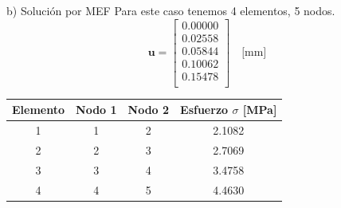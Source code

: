 \begin{desarrollo}{b) Soluci\'on por MEF}
Para este caso tenemos 4 elementos, 5 nodos.
\begin{equation}
\mathbf{u} = \begin{bmatrix}
    0.00000 \\
    0.02558 \\
    0.05844 \\
    0.10062 \\
    0.15478 \\
\end{bmatrix} \quad \text{[mm]}
\label{tab:esfuerzos4}
\end{equation}

\begin{center}
    
    \centering
    \begin{tabular}{cccc}
        \hline
        \textbf{Elemento} & \textbf{Nodo 1} & \textbf{Nodo 2} & \textbf{Esfuerzo $\sigma$ [MPa]} \\
        \hline
        1 & 1 & 2 & 2.1082 \\
        2 & 2 & 3 & 2.7069 \\
        3 & 3 & 4 & 3.4758 \\
        4 & 4 & 5 & 4.4630 \\
        \hline
    \end{tabular}
\label{tab:esfuerzos4}

    \label{tab:esfuerzos}
\end{center}


\end{desarrollo}
\newpage
